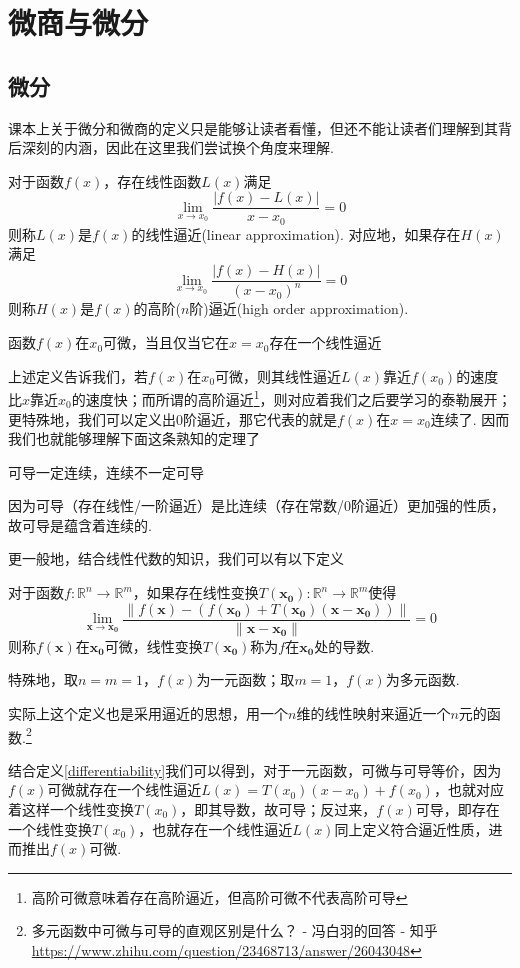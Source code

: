 
\section{微商与微分}
\subsection{微分}
课本上关于微分和微商的定义只是能够让读者看懂，但还不能让读者们理解到其背后深刻的内涵，因此在这里我们尝试换个角度来理解.
\begin{definition}
对于函数$f(x)$，存在线性函数$L(x)$满足
\[\lim_{x\to x_0}\frac{|f(x)-L(x)|}{x-x_0}=0\]
则称$L(x)$是$f(x)$的线性逼近(linear approximation).
对应地，如果存在$H(x)$满足
\[\lim_{x\to x_0}\frac{|f(x)-H(x)|}{(x-x_0)^n}=0\]
则称$H(x)$是$f(x)$的高阶($n$阶)逼近(high order approximation).
\end{definition}
\begin{definition}[可微性]
\label{differentiability}
函数$f(x)$在$x_0$可微，当且仅当它在$x=x_0$存在一个线性逼近
\end{definition}
上述定义告诉我们，若$f(x)$在$x_0$可微，则其线性逼近$L(x)$靠近$f(x_0)$的速度比$x$靠近$x_0$的速度快；而所谓的高阶逼近\footnote{高阶可微意味着存在高阶逼近，但高阶可微不代表高阶可导}，则对应着我们之后要学习的泰勒展开；更特殊地，我们可以定义出$0$阶逼近，那它代表的就是$f(x)$在$x=x_0$连续了. 因而我们也就能够理解下面这条熟知的定理了
\begin{theorem}
可导一定连续，连续不一定可导
\end{theorem}
因为可导（存在线性/一阶逼近）是比连续（存在常数/$0$阶逼近）更加强的性质，故可导是蕴含着连续的.
\par 更一般地，结合线性代数的知识，我们可以有以下定义
\begin{definition}
对于函数$f:\mathbb{R}^n\to\mathbb{R}^m$，如果存在线性变换$T(\mathbf{x_0}):\mathbb{R}^n\to\mathbb{R}^m$使得
\[\lim_{\mathbf{x}\to \mathbf{x_0}}\frac{\|f(\mathbf{x})-(f(\mathbf{x_0})+T(\mathbf{x_0})(\mathbf{x}-\mathbf{x_0}))\|}{\|\mathbf{x}-\mathbf{x_0}\|}=0\]
则称$f(\mathbf{x})$在$\mathbf{x_0}$可微，线性变换$T(\mathbf{x_0})$称为$f$在$\mathbf{x_0}$处的导数.
\par 特殊地，取$n=m=1$，$f(x)$为一元函数；取$m=1$，$f(x)$为多元函数.
\end{definition}
实际上这个定义也是采用逼近的思想，用一个$n$维的线性映射来逼近一个$n$元的函数.\footnote{多元函数中可微与可导的直观区别是什么？ - 冯白羽的回答 - 知乎 \url{https://www.zhihu.com/question/23468713/answer/26043048}}
\par 结合定义\ref{differentiability}我们可以得到，对于一元函数，可微与可导等价，因为$f(x)$可微就存在一个线性逼近$L(x)=T(x_0)(x-x_0)+f(x_0)$，也就对应着这样一个线性变换$T(x_0)$，即其导数，故可导；反过来，$f(x)$可导，即存在一个线性变换$T(x_0)$，也就存在一个线性逼近$L(x)$同上定义符合逼近性质，进而推出$f(x)$可微.
